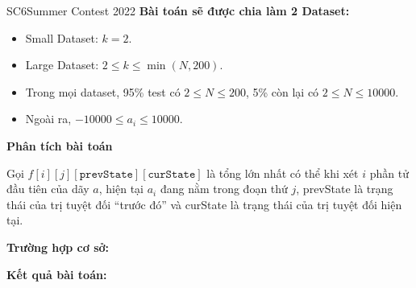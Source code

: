 \begin{baitap}{SC6}{Summer Contest 2022}
\textbf{Bài toán sẽ được chia làm 2 Dataset:}  
\begin{itemize}
  \item Small Dataset: $k = 2$.
  \item Large Dataset: $2 \leq k \leq \min(N,200)$.  
  \item Trong mọi dataset, 95\% test có $2 \leq N \leq 200$, 5\% còn lại có $2 \leq N \leq 10000$.  
  \item Ngoài ra, $-10000 \leq a_i \leq 10000$.  
\end{itemize}

\end{baitap}


\textbf{Phân tích bài toán}

    Gọi $f[i][j][\texttt{prevState}][\texttt{curState}]$ là tổng lớn nhất có thể khi xét $i$ phần tử đầu tiên của dãy $a$, hiện tại $a_i$ đang nằm trong đoạn thứ $j$, prevState là trạng thái của trị tuyệt đối ``trước đó'' và curState là trạng thái của trị tuyệt đối hiện tại.

\textbf{Trường hợp cơ sở:} 

\textbf{Kết quả bài toán:}

\begin{lstlisting}[title=\centering\textbf{Cài đặt}]

\end{lstlisting}
